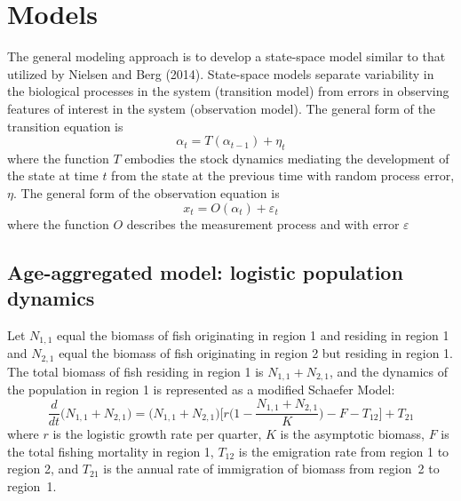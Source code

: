 \documentclass[12pt,letterpaper]{article}
\newcommand\help[1]{\color{Magenta}{\it #1 }\normalcolor}
\newcommand\None{{N_{1,1}}}
\newcommand\Ntwo{{N_{2,1}}}
\newcommand\Nsum{{N_{1,1}+N_{2,1}}}
\begin{document}


\section*{Models}
The general modeling approach is to develop a state-space model
similar to that utilized by Nielsen and Berg (2014).
State-space models separate variability in the biological
processes in the system (transition model)
from errors in observing features of interest
in the system (observation model). 
The general form of the transition equation is
\begin{equation}
\alpha_t=T(\alpha_{t-1}) + \eta_t
\end{equation}
where the function $T$ embodies the stock dynamics mediating the
development of the state at time $t$ from the state at the previous
time with random process error, $\eta$.
The general form of the observation equation is
\begin{equation}
x_t = O(\alpha_t) + \varepsilon_t
\end{equation}
where the function $O$ describes the measurement process and with
error $\varepsilon$

\subsection*{Age-aggregated model: logistic population dynamics}

Let $\None$ equal the biomass of fish originating in region 1
and residing in region 1
and $\Ntwo$ equal the biomass of fish originating in region 2
but residing in region 1.
The total biomass of fish residing in region 1 is
$\Nsum$, and the dynamics of the population in region 1 is represented
as a modified Schaefer Model:
\begin{equation}
\frac{d}{dt}\big(\Nsum\big)=\big(\Nsum\big)\Big[r\Big(1-\frac{\Nsum}{K}\Big)-F-T_{12}\Big]+T_{21}
\label{eqn:logistic}
\end{equation}
where $r$ is the logistic growth rate per quarter, $K$ is the
asymptotic biomass,
$F$ is the total fishing mortality in region 1, $T_{12}$
is the emigration rate from region 1 to region 2, and $T_{21}$
is the annual rate of immigration of biomass from region~2 to region~1.
\end{document}
